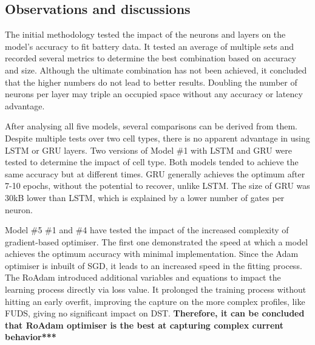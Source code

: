 %
%
\subsection{Observations and discussions}
%
%
The initial methodology tested the impact of the neurons and layers on the model's accuracy to fit battery data.
It tested an average of multiple sets and recorded several metrics to determine the best combination based on accuracy and size.
Although the ultimate combination has not been achieved, it concluded that the higher numbers do not lead to better results.
Doubling the number of neurons per layer may triple an occupied space without any accuracy or latency advantage.

%
%
After analysing all five models, several comparisons can be derived from them.
Despite multiple tests over two cell types, there is no apparent advantage in using LSTM or GRU layers.
Two versions of Model \#1 with LSTM and GRU were tested to determine the impact of cell type.
Both models tended to achieve the same accuracy but at different times.
GRU generally achieves the optimum after 7-10 epochs, without the potential to recover, unlike LSTM. %
The size of GRU was 30kB lower than LSTM, which is explained by a lower number of gates per neuron.

%

%
%
Model \#5 \#1 and \#4 have tested the impact of the increased complexity of gradient-based optimiser.
The first one demonstrated the speed at which a model achieves the optimum accuracy with minimal implementation.
Since the Adam optimiser is inbuilt of SGD, it leads to an increased speed in the fitting process.
The RoAdam introduced additional variables and equations to impact the learning process directly via loss value.
It prolonged the training process without hitting an early overfit, improving the capture on the more complex profiles, like FUDS, giving no significant impact on DST. 
\textbf{Therefore, it can be concluded that RoAdam optimiser is the best at capturing complex current behavior***}

